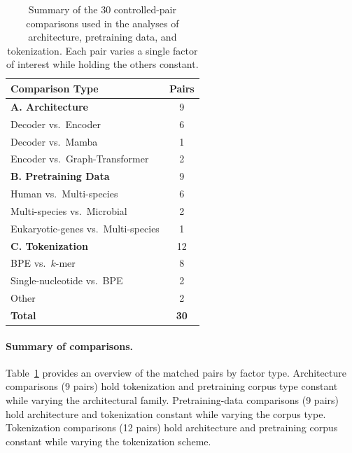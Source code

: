 \documentclass{article}
\theoremstyle{plain}
\theoremstyle{definition}
\theoremstyle{remark}
\begin{document}
\begin{table}[h]
\centering
\caption{Summary of the $30$ controlled-pair comparisons used in the
analyses of architecture, pretraining data, and tokenization. Each pair
varies a single factor of interest while holding the others constant.}
\label{tab:pairs_summary}
\small
\begin{tabular}{@{}lc@{}}
\toprule
\textbf{Comparison Type} & \textbf{Pairs} \\
\midrule
\textbf{A. Architecture}                                  & 9 \\
\quad Decoder vs.\ Encoder                                & 6 \\
\quad Decoder vs.\ Mamba                                  & 1 \\
\quad Encoder vs.\ Graph-Transformer                      & 2 \\
\midrule
\textbf{B. Pretraining Data}                              & 9 \\
\quad Human vs.\ Multi-species                            & 6 \\
\quad Multi-species vs.\ Microbial                        & 2 \\
\quad Eukaryotic-genes vs.\ Multi-species                 & 1 \\
\midrule
\textbf{C. Tokenization}                                  & 12 \\
\quad BPE vs.\ $k$-mer                                    & 8 \\
\quad Single-nucleotide vs.\ BPE                          & 2 \\
\quad Other                                               & 2 \\
\midrule
\textbf{Total}                                            & \textbf{30} \\
\bottomrule
\end{tabular}
\end{table}

\paragraph{Summary of comparisons.}
Table~\ref{tab:pairs_summary} provides an overview of the matched pairs
by factor type. Architecture comparisons (9 pairs) hold tokenization and
pretraining corpus type constant while varying the architectural family.
Pretraining-data comparisons (9 pairs) hold architecture and tokenization
constant while varying the corpus type. Tokenization comparisons (12 pairs)
hold architecture and pretraining corpus constant while varying the
tokenization scheme.
\end{document}
